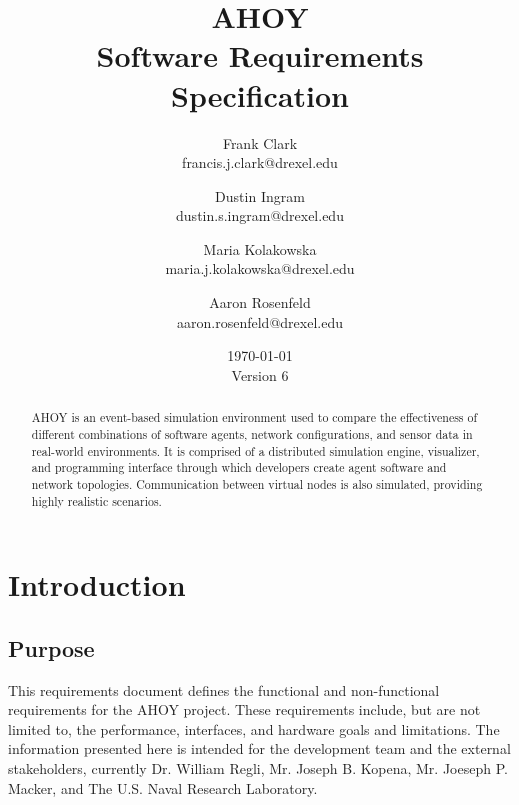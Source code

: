 \documentclass[titlepage]{article}
\title{\textbf{AHOY \\Software Requirements Specification}}
\author{
	Frank Clark \\francis.j.clark@drexel.edu
    \and Dustin Ingram \\dustin.s.ingram@drexel.edu
	\and Maria Kolakowska \\maria.j.kolakowska@drexel.edu
    \and Aaron Rosenfeld \\aaron.rosenfeld@drexel.edu
}
\date{\today\\Version 6}
\begin{document}

%    

\maketitle

\begin{abstract}
AHOY is an event-based simulation environment used to compare the effectiveness of different combinations of software agents, network configurations, and sensor data in real-world environments.  It is comprised of a distributed simulation engine, visualizer, and programming interface through which developers create agent software and network topologies.  Communication between virtual nodes is also simulated, providing highly realistic scenarios.
\end{abstract}

\setcounter{tocdepth}{4}
\tableofcontents
\pagebreak
\listoffigures
\pagebreak
{}



\section{Introduction%
  \label{introduction}%
}


\subsection{Purpose%
  \label{purpose}%
}

This requirements document defines the functional and non-functional requirements for the AHOY project.  These requirements include, but are not limited to, the performance, interfaces, and hardware goals and limitations.  The information presented here is intended for the development team and the external stakeholders, currently Dr. William Regli, Mr. Joseph B. Kopena, Mr. Joeseph P. Macker, and The U.S. Naval Research Laboratory.
\end{document}
